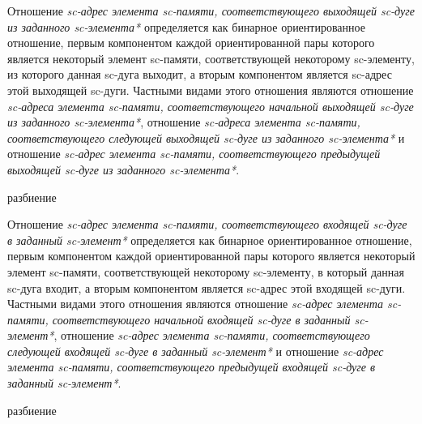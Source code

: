 Отношение \textit{sc-адрес элемента sc-памяти, соответствующего выходящей sc-дуге из заданного sc-элемента*} определяется как бинарное ориентированное отношение, первым компонентом каждой ориентированной пары которого является некоторый элемент sc-памяти, соответствующей некоторому sc-элементу, из которого данная sc-дуга выходит, а вторым компонентом является sc-адрес этой выходящей sc-дуги. Частными видами этого отношения являются отношение \textit{sc-адреса элемента sc-памяти, соответствующего начальной выходящей sc-дуге из заданного sc-элемента*}, отношение \textit{sc-адреса элемента sc-памяти, соответствующего следующей выходящей sc-дуге из заданного sc-элемента*} и отношение \textit{sc-адрес элемента sc-памяти, соответствующего предыдущей выходящей sc-дуге из заданного sc-элемента*}.

\begin{SCn}
\begin{scnrelfromset}{разбиение}
\end{scnrelfromset}
\end{SCn}

Отношение \textit{sc-адрес элемента sc-памяти, соответствующего входящей sc-дуге в заданный sc-элемент*} определяется как бинарное ориентированное отношение, первым компонентом каждой ориентированной пары которого является некоторый элемент sc-памяти, соответствующей некоторому sc-элементу, в который данная sc-дуга входит, а вторым компонентом является sc-адрес этой входящей sc-дуги. Частными видами этого отношения являются отношение \textit{sc-адрес элемента sc-памяти, соответствующего начальной входящей sc-дуге в заданный sc-элемент*}, отношение \textit{sc-адрес элемента sc-памяти, соответствующего следующей входящей sc-дуге в заданный sc-элемент*} и отношение \textit{sc-адрес элемента sc-памяти, соответствующего предыдущей входящей sc-дуге в заданный sc-элемент*}.

\begin{SCn}
\begin{scnrelfromset}{разбиение}
\end{scnrelfromset}
\end{SCn}

